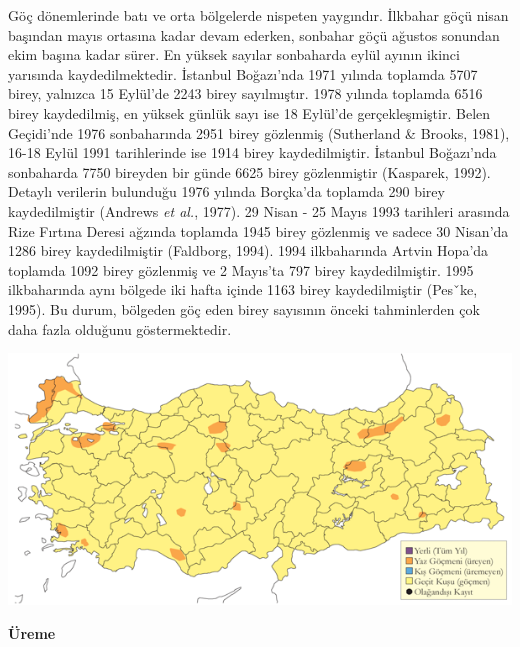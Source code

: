 \documentclass[
  a4paper,
  DIV=11,
  numbers=noendperiod]{scrreprt}
\begin{document}
Göç dönemlerinde batı ve orta bölgelerde nispeten yaygındır. İlkbahar
göçü nisan başından mayıs ortasına kadar devam ederken, sonbahar göçü
ağustos sonundan ekim başına kadar sürer. En yüksek sayılar sonbaharda
eylül ayının ikinci yarısında kaydedilmektedir. İstanbul Boğazı'nda 1971
yılında toplamda 5707 birey, yalnızca 15 Eylül'de 2243 birey
sayılmıştır. 1978 yılında toplamda 6516 birey kaydedilmiş, en yüksek
günlük sayı ise 18 Eylül'de gerçekleşmiştir. Belen Geçidi'nde 1976
sonbaharında 2951 birey gözlenmiş (Sutherland \& Brooks, 1981), 16-18
Eylül 1991 tarihlerinde ise 1914 birey kaydedilmiştir. İstanbul
Boğazı'nda sonbaharda 7750 bireyden bir günde 6625 birey gözlenmiştir
(Kasparek, 1992). Detaylı verilerin bulunduğu 1976 yılında Borçka'da
toplamda 290 birey kaydedilmiştir (Andrews \emph{et al.}, 1977). 29
Nisan - 25 Mayıs 1993 tarihleri arasında Rize Fırtına Deresi ağzında
toplamda 1945 birey gözlenmiş ve sadece 30 Nisan'da 1286 birey
kaydedilmiştir (Faldborg, 1994). 1994 ilkbaharında Artvin Hopa'da
toplamda 1092 birey gözlenmiş ve 2 Mayıs'ta 797 birey kaydedilmiştir.
1995 ilkbaharında aynı bölgede iki hafta içinde 1163 birey
kaydedilmiştir (Pesˇke, 1995). Bu durum, bölgeden göç eden birey
sayısının önceki tahminlerden çok daha fazla olduğunu göstermektedir.

\includegraphics{images/harita_Page_099.png}

\textbf{Üreme}
\end{document}
